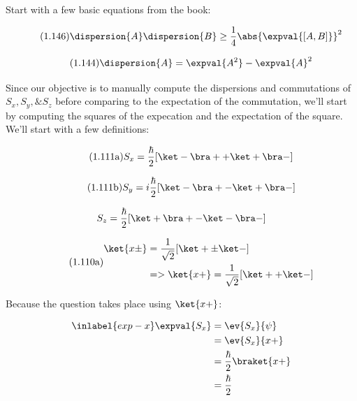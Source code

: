 \begin{answer}
Start with a few basic equations from the book:

\begin{equation*}
  \tag{1.146}
  \dispersion{A}\dispersion{B} \ge \frac{1}{4} \abs{\expval{[A,B]}}^2
\end{equation*}

\begin{equation*}
  \tag{1.144}
  \dispersion{A} = \expval{A^2} - \expval{A}^2
\end{equation*}


Since our objective is to manually compute the dispersions and
commutations of $S_x, S_y, \& S_z$ before comparing to the expectation
of the commutation, we'll start by computing the squares of the
expecation and the expectation of the square.  We'll start with a few
definitions:

\begin{equation*}
  \tag{1.111a}
  S_x = \frac{\hbar}{2} [\ket - \bra + + \ket + \bra - ]
\end{equation*}

\begin{equation*}
  \tag{1.111b}
  S_y = i \frac{\hbar}{2} [\ket - \bra + - \ket + \bra - ]
\end{equation*}

\begin{equation*}
  S_z = \frac{\hbar}{2} [\ket + \bra + - \ket - \bra - ]
\end{equation*}

\begin{equation*}
  \tag{1.110a}
  \begin{split}
    \ket{x\pm} &= \frac{1}{\sqrt{2}} [\ket + \pm \ket -]\\
    &=> \ket{x+} = \frac{1}{\sqrt{2}} [\ket + + \ket -]
  \end{split}
\end{equation*}


Because the question takes place using $\ket{x+}$:

\begin{equation}
  \begin{split}
  \inlabel{exp-x}
  \expval{S_x} &= \ev{S_x}{\psi}\\
  &= \ev{S_x}{x+}\\
  &= \frac{\hbar}{2}\braket{x+}\\
  &= \frac{\hbar}{2}
  \end{split}
\end{equation}


\end{answer}
